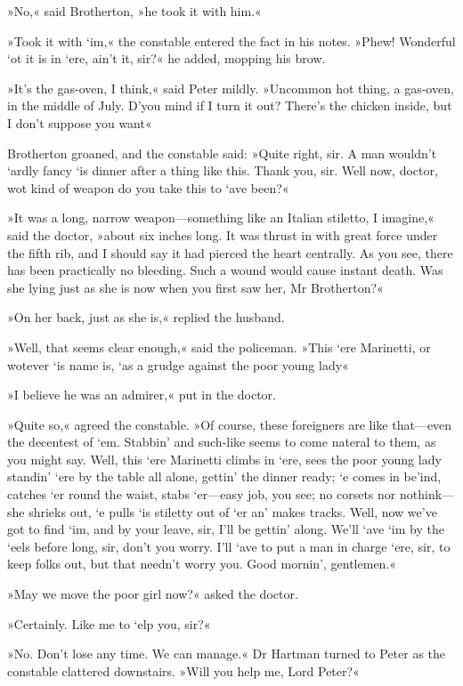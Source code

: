 »No,« said Brotherton, »he took it with him.«

»Took it with `im,« the constable entered the fact in his notes. »Phew! Wonderful `ot it is in `ere, ain't it, sir?« he added, mopping his brow.

»It's the gas-oven, I think,« said Peter mildly. »Uncommon hot thing, a gas-oven, in the middle of July. D'you mind if I turn it out? There's the chicken inside, but I don't suppose you want\longdash«

Brotherton groaned, and the constable said: »Quite right, sir. A man wouldn't `ardly fancy `is dinner after a thing like this. Thank you, sir. Well now, doctor, wot kind of weapon do you take this to `ave been?«

»It was a long, narrow weapon—something like an Italian stiletto, I imagine,« said the doctor, »about six inches long. It was thrust in with great force under the fifth rib, and I should say it had pierced the heart centrally. As you see, there has been practically no bleeding. Such a wound would cause instant death. Was she lying just as she is now when you first saw her, Mr Brotherton?«

»On her back, just as she is,« replied the husband.

»Well, that seems clear enough,« said the policeman. »This `ere Marinetti, or wotever `is name is, `as a grudge against the poor young lady\longdash«

»I believe he was an admirer,« put in the doctor.

»Quite so,« agreed the constable. »Of course, these foreigners are like that—even the decentest of `em. Stabbin' and such-like seems to come nateral to them, as you might say. Well, this `ere Marinetti climbs in `ere, sees the poor young lady standin' `ere by the table all alone, gettin' the dinner ready; `e comes in be'ind, catches `er round the waist, stabs `er—easy job, you see; no corsets nor nothink—she shrieks out, `e pulls `is stiletty out of `er an' makes tracks. Well, now we've got to find `im, and by your leave, sir, I'll be gettin' along. We'll `ave `im by the `eels before long, sir, don't you worry. I'll `ave to put a man in charge `ere, sir, to keep folks out, but that needn't worry you. Good mornin', gentlemen.«

»May we move the poor girl now?« asked the doctor.

»Certainly. Like me to `elp you, sir?«

»No. Don't lose any time. We can manage.« Dr Hartman turned to Peter as the constable clattered downstairs. »Will you help me, Lord Peter?«

